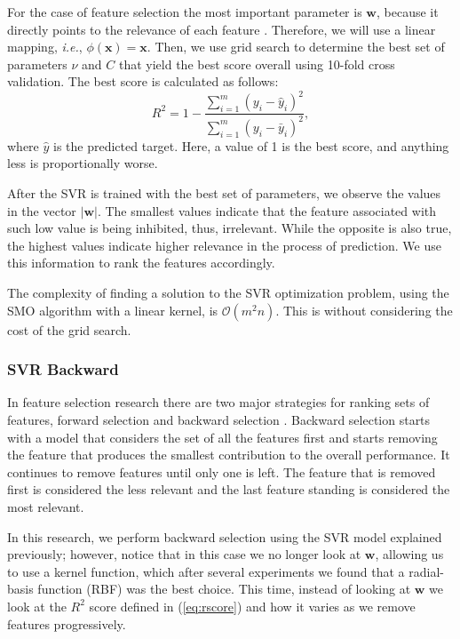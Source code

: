 \documentclass{bmcart}
\begin{document}
For the case of feature selection the most important parameter is $\mathbf{w}$,
because it directly points to the relevance of each feature
\cite{chen2008feature,rakotomamonjy2003variable,chang2008feature}. Therefore,
we will use a linear mapping, \emph{i.e.}, $\phi(\mathbf{x})=\mathbf{x}$.  Then, we
use grid search to determine the best set of parameters $\nu$ and $C$ that
yield the best score overall using 10-fold cross validation. The best score is
calculated as follows:
\begin{equation}
R^2 = 1 - \frac{\sum_{i=1}^m (y_i - \hat{y}_i)^2}
{\sum_{i=1}^m (y_i -\bar{y}_i)^2} ,
\label{eq:rscore}
\end{equation}
where $\hat{y}$ is the predicted target. Here, a value of 1 is the best score,
and anything less is proportionally worse.

After the SVR is trained with the best set of parameters, we observe the values
in the vector $|\mathbf{w}|$. The smallest values indicate that the feature
associated with such low value is being inhibited, thus, irrelevant. While the
opposite is also true, the highest values indicate higher relevance in the
process of prediction. We use this information to rank the features
accordingly.

The complexity of finding a solution to the SVR optimization problem, using the
SMO algorithm with a linear kernel, is $\mathcal{O}(m^2n)$. 
This is without considering the cost of the grid search.

\subsubsection*{SVR Backward}
In feature selection research there are two major strategies for ranking 
sets of features, forward selection and backward selection
\cite{guyon2008feature}. Backward selection starts with a model that considers
the set of all the features first and starts removing the feature that produces
the smallest contribution to the overall performance. It continues to remove
features until only one is left. The feature that is removed first is
considered the less relevant and the last feature standing is considered the
most relevant. 

In this research, we perform backward selection using the SVR 
model explained previously; however, notice that in this case we no
longer look at $\mathbf{w}$, allowing us to use a kernel function, which
after several experiments we found that a radial-basis function (RBF) was the
best choice. This time, instead of looking at $\mathbf{w}$ we look at the $R^2$
score defined in (\ref{eq:rscore}) and how it varies as we remove features
progressively.
\end{document}
